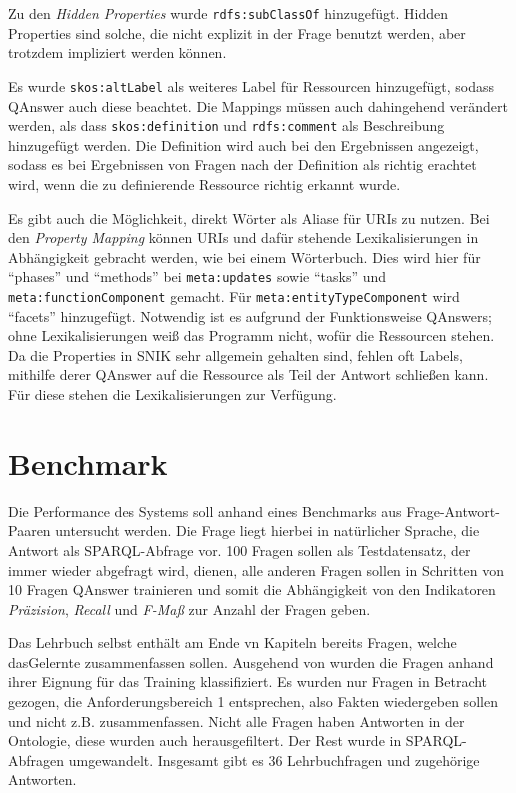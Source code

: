 \documentclass[utf8,biblatex]{lni}
\begin{document}
Zu den \emph{Hidden Properties} wurde \texttt{rdfs:subClassOf} hinzugefügt.
Hidden Properties sind solche, die nicht explizit in der Frage benutzt werden, aber trotzdem impliziert werden können.

Es wurde \texttt{skos:altLabel} als weiteres Label für Ressourcen hinzugefügt, sodass QAnswer auch diese beachtet.
Die Mappings müssen auch dahingehend verändert werden, als dass \texttt{skos:definition}
und \texttt{rdfs:comment} als Beschreibung hinzugefügt werden.
Die Definition wird auch bei den Ergebnissen angezeigt, sodass es bei Ergebnissen von Fragen nach der Definition als richtig erachtet wird, wenn die zu definierende Ressource richtig erkannt wurde.

Es gibt auch die Möglichkeit, direkt Wörter als Aliase für URIs zu nutzen.
Bei den \emph{Property Mapping} können URIs und dafür stehende Lexikalisierungen in Abhängigkeit gebracht werden, wie bei einem Wörterbuch.
Dies wird hier für \enquote{phases} und \enquote{methods} bei \texttt{meta:updates} sowie \enquote{tasks} und \texttt{meta:functionComponent} gemacht.
Für \texttt{meta:entityTypeComponent} wird \enquote{facets} hinzugefügt.
Notwendig ist es aufgrund der Funktionsweise QAnswers; ohne Lexikalisierungen weiß das Programm nicht, wofür die Ressourcen stehen.
Da die Properties in SNIK sehr allgemein gehalten sind, fehlen oft Labels, mithilfe derer QAnswer auf die Ressource als Teil der Antwort schließen kann.
Für diese stehen die Lexikalisierungen zur Verfügung.

\section{Benchmark}

Die Performance des Systems soll anhand eines Benchmarks aus Frage-Antwort-Paaren untersucht werden.
Die Frage liegt hierbei in natürlicher Sprache, die Antwort als SPARQL-Abfrage vor.
100 Fragen sollen als Testdatensatz, der immer wieder abgefragt wird, dienen,
alle anderen Fragen sollen in Schritten von 10 Fragen QAnswer trainieren und somit die Abhängigkeit von den Indikatoren \emph{Präzision}, \emph{Recall} und \emph{F-Maß} zur Anzahl der Fragen geben.

Das Lehrbuch selbst \cite{bb} enthält am Ende vn Kapiteln bereits Fragen, welche dasGelernte zusammenfassen sollen.
Ausgehend von \cite{arneba} wurden die Fragen anhand ihrer Eignung für das Training klassifiziert.
Es wurden nur Fragen in Betracht gezogen, die Anforderungsbereich 1 entsprechen, also Fakten wiedergeben sollen und nicht z.B. zusammenfassen.
Nicht alle Fragen haben Antworten in der Ontologie, diese wurden auch herausgefiltert.
Der Rest wurde in SPARQL-Abfragen umgewandelt.
Insgesamt gibt es 36 Lehrbuchfragen und zugehörige Antworten.
\end{document}
